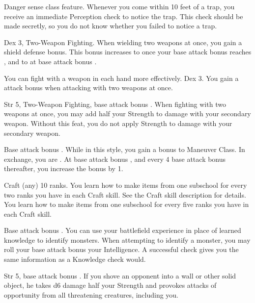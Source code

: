 \featpre Danger sense class feature.
\featben Whenever you come within 10 feet of a trap, you receive an immediate Perception check to notice the trap. This check should be made secretly, so you do not know whether you failed to notice a trap.

 Dex 3, Two-Weapon Fighting.
 When wielding two weapons at once, you gain a  shield defense bonus. This bonus increases to  once your base attack bonus reaches , and to  at base attack bonus .

You can fight with a weapon in each hand more effectively.
 Dex 3.
 You gain a  attack bonus when attacking with two weapons at once.

 Str 5, Two-Weapon Fighting, base attack bonus .
 When fighting with two weapons at once, you may add half your Strength to damage with your secondary weapon.
 Without this feat, you do not apply Strength to damage with your secondary weapon.

 Base attack bonus .
 While in this style, you gain a  bonus to Maneuver Class. In exchange, you are \immobilized. At base attack bonus , and every 4 base attack bonus thereafter, you increase the bonus by 1.

 Craft (any) 10 ranks.
 You learn how to make items from one subschool for every two ranks you have in each Craft skill. See the Craft skill description for details.
 You learn how to make items from one subschool for every five ranks you have in each Craft skill.

\featpre Base attack bonus .
\featben You can use your battlefield experience in place of learned knowledge to identify monsters. When attempting to identify a monster, you may roll your base attack bonus \add your Intelligence. A successful check gives you the same information as a Knowledge check would.

\featpre Str 5, base attack bonus .
\featben If you shove an opponent into a wall or other solid object, he takes d6 damage \add half your Strength and provokes attacks of opportunity from all threatening creatures, including you.

